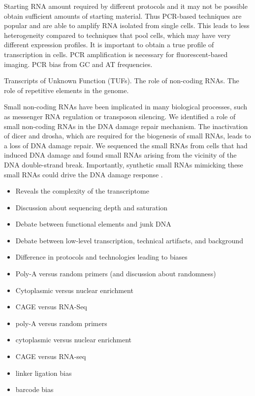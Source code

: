 Starting RNA amount required by different protocols and it may not be possible obtain sufficient amounts of starting material. Thus PCR-based techniques are popular and are able to amplify RNA isolated from single cells. This leads to less heterogeneity compared to techniques that pool cells, which may have very different expression profiles. It is important to obtain a true profile of transcription in cells. PCR amplification is necessary for fluorescent-based imaging. PCR bias from GC and AT frequencies.

Transcripts of Unknown Function (TUFs). The role of non-coding RNAs. The role of repetitive elements in the genome.

Small non-coding RNAs have been implicated in many biological processes, such as messenger RNA regulation or transposon silencing. We identified a role of small non-coding RNAs in the DNA damage repair mechanism. The inactivation of dicer and drosha, which are required for the biogenesis of small RNAs, leads to a loss of DNA damage repair. We sequenced the small RNAs from cells that had induced DNA damage and found small RNAs arising from the vicinity of the DNA double-strand break. Importantly, synthetic small RNAs mimicking these small RNAs could drive the DNA damage response \cite{francia2012site}.

\begin{itemize}
   \item Reveals the complexity of the transcriptome
   \item Discussion about sequencing depth and saturation
   \item Debate between functional elements and junk DNA
   \item Debate between low-level transcription, technical artifacts, and background
   \item Difference in protocols and technologies leading to biases
   \item Poly-A versus random primers (and discussion about randomness)
   \item Cytoplasmic versus nuclear enrichment
   \item CAGE versus RNA-Seq
\end{itemize}

\begin{itemize}
   \item poly-A versus random primers
   \item cytoplasmic versus nuclear enrichment
   \item CAGE versus RNA-seq
   \item linker ligation bias
   \item barcode bias
\end{itemize}

